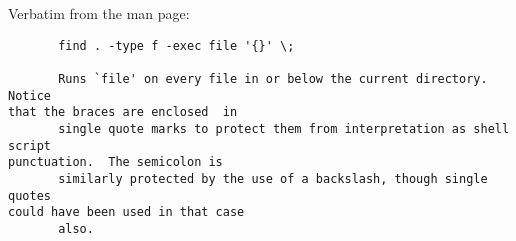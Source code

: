 \documentclass[10pt]{article}
\begin{document}
Verbatim from the man page:

\begin{verbatim}
       find . -type f -exec file '{}' \;

       Runs `file' on every file in or below the current directory.  Notice
that the braces are enclosed  in
       single quote marks to protect them from interpretation as shell script
punctuation.  The semicolon is
       similarly protected by the use of a backslash, though single quotes
could have been used in that case
       also.
\end{verbatim}
\end{document}
